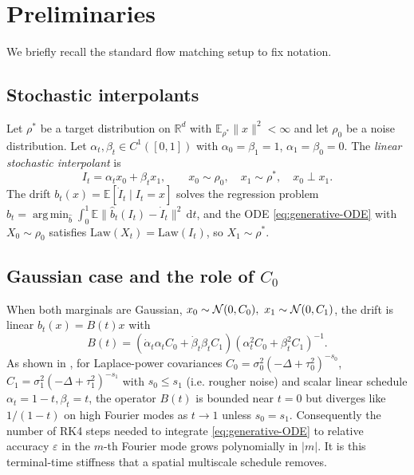 \documentclass[11pt]{amsart}
\newcommand{\bE}{\mathbb{E}} \newcommand{\bP}{\mathbb{P}}
\newcommand{\bR}{\mathbb{R}} \newcommand{\bN}{\mathbb{N}}
\newcommand{\rd}{\mathrm{d}}
\DeclareMathOperator*{\argmin}{arg\,min}
\theoremstyle{remark}
\numberwithin{equation}{section}
\begin{document}
\section{Preliminaries}
\label{sec:preliminaries}
We briefly recall the standard flow matching setup to fix notation.

\subsection{Stochastic interpolants}
Let $\rho^*$ be a target distribution on $\bR^d$ with $\bE_{\rho^*}\|x\|^2<\infty$ and let $\rho_0$ be a noise distribution. Let $\alpha_t,\beta_t\in C^1([0,1])$ with $\alpha_0=\beta_1=1$, $\alpha_1=\beta_0=0$. The \emph{linear stochastic interpolant} is
\begin{equation}
 I_t = \alpha_t x_0+\beta_t x_1,\qquad x_0\sim\rho_0,\quad x_1\sim\rho^*,\quad x_0\perp x_1.
\end{equation}
The drift $b_t(x)=\bE[\dot I_t\mid I_t=x]$ solves the regression problem $b_t=\argmin_{\hat b}\int_0^1\bE\|\hat b_t(I_t)-\dot I_t\|^2\,\rd t$, and the ODE \eqref{eq:generative-ODE} with $X_0\sim\rho_0$ satisfies $\mathrm{Law}(X_t)=\mathrm{Law}(I_t)$, so $X_1\sim\rho^*$.

\subsection{Gaussian case and the role of $C_0$}
When both marginals are Gaussian, $x_0\sim\mathcal{N}(0,C_0),\ x_1\sim\mathcal{N}(0,C_1)$, the drift is linear $b_t(x)=B(t)x$ with
\begin{equation}
\label{eq:B-linear}
 B(t) = (\dot\alpha_t\alpha_t C_0+\dot\beta_t\beta_t C_1)(\alpha_t^2 C_0+\beta_t^2 C_1)^{-1}.
\end{equation}
As shown in \cite{chen2025scale}, for Laplace-power covariances
$C_0=\sigma_0^2(-\Delta+\tau_0^2)^{-s_0}$, $C_1=\sigma_1^2(-\Delta+\tau_1^2)^{-s_1}$ with $s_0\le s_1$ (i.e. rougher noise) and scalar linear schedule $\alpha_t=1-t,\beta_t=t$, the operator $B(t)$ is bounded near $t=0$ but diverges like $1/(1-t)$ on high Fourier modes as $t\to1$ unless $s_0=s_1$. Consequently the number of RK4 steps needed to integrate \eqref{eq:generative-ODE} to relative accuracy $\varepsilon$ in the $m$-th Fourier mode grows polynomially in $|m|$. It is this terminal-time stiffness that a spatial multiscale schedule removes.
\end{document}
